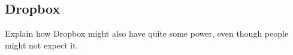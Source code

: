 \subsection{Dropbox}
Explain how Dropbox might also have quite some power, even though people might not expect it.
\newpage
